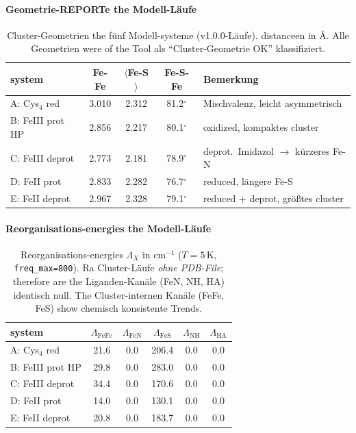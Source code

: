 \documentclass[11pt,a4paper,twoside]{article}
\providecommand{\angstrom}{\text{\AA}}    %
\theoremstyle{remark}
\begin{document}
\paragraph{Geometrie-REPORTe the Modell-L\"aufe}

\begin{table}[h]
\centering
\small
\begin{tabular}{|l|c|c|c|l|}
\hline
\textbf{system} & \textbf{Fe-Fe} & \textbf{$\langle$Fe-S$\rangle$} &
  \textbf{Fe-S-Fe} & \textbf{Bemerkung} \\
\hline
A: Cys$_4$ red    & 3.010 & 2.312 & 81.2$^{\circ}$ & Mischvalenz, leicht asymmetrisch \\
B: FeIII prot HP  & 2.856 & 2.217 & 80.1$^{\circ}$ & oxidized, kompaktes cluster \\
C: FeIII deprot   & 2.773 & 2.181 & 78.9$^{\circ}$ & deprot.\ Imidazol $\to$ k\"urzeres Fe-N \\
D: FeII prot      & 2.833 & 2.282 & 76.7$^{\circ}$ & reduced, l\"angere Fe-S \\
E: FeII deprot    & 2.967 & 2.328 & 79.1$^{\circ}$ & reduced + deprot, gr\"o{\ss}tes cluster \\
\hline
\end{tabular}
\caption{Cluster-Geometrien the f\"unf Modell-systeme (v1.0.0-L\"aufe).
distanceen in $\angstrom$. Alle Geometrien were of the Tool als
"`Cluster-Geometrie OK"' klassifiziert.}
\label{tab:val-geometrie}
\end{table}

\paragraph{Reorganisations-energies the Modell-L\"aufe}

\begin{table}[h]
\centering
\small
\begin{tabular}{|l|c|c|c|c|c|}
\hline
\textbf{system} & $\Lambda_\text{FeFe}$ & $\Lambda_\text{FeN}$ &
  $\Lambda_\text{FeS}$ & $\Lambda_\text{NH}$ & $\Lambda_\text{HA}$ \\
\hline
A: Cys$_4$ red       & 21.6 & 0.0 & 206.4 & 0.0 & 0.0 \\
B: FeIII prot HP   & 29.8 & 0.0 & 283.0 & 0.0 & 0.0 \\
C: FeIII deprot      & 34.4 & 0.0 & 170.6 & 0.0 & 0.0 \\
D: FeII prot         & 14.0 & 0.0 & 130.1 & 0.0 & 0.0 \\
E: FeII deprot       & 20.8 & 0.0 & 183.7 & 0.0 & 0.0 \\
\hline
\end{tabular}
\caption{Reorganisations-energies $\Lambda_X$ in cm$^{-1}$
($T=5$\,K, \texttt{freq\_max=800}). Ra Cluster-L\"aufe
\emph{ohne PDB-File}; therefore are the Liganden-Kan\"ale (FeN, NH, HA)
identisch null. The Cluster-internen Kan\"ale (FeFe, FeS) show
chemisch konsistente Trends.}
\label{tab:val-reorg-modell}
\end{table}
\end{document}
